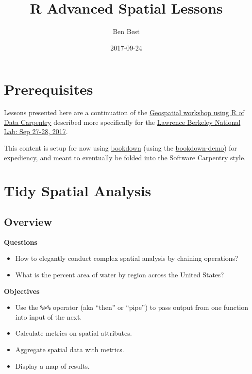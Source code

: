 \documentclass[]{book}
\title{R Advanced Spatial Lessons}
\author{Ben Best}
\date{2017-09-24}
\providecommand{\tightlist}{%
  \setlength{\itemsep}{0pt}\setlength{\parskip}{0pt}}
\theoremstyle{definition}
\theoremstyle{definition}
\theoremstyle{definition}
\theoremstyle{remark}
\begin{document}
\maketitle

{
\setcounter{tocdepth}{1}
\tableofcontents
}
\chapter*{Prerequisites}\label{prereq}

Lessons presented here are a continuation of the
\href{http://www.datacarpentry.org/lessons/\#geospatial-data-workshop}{Geospatial
workshop using R of Data Carpentry} described more specifically for the
\href{https://jsta.github.io/2017-09-27-LBNL/}{Lawrence Berkeley
National Lab: Sep 27-28, 2017}.

This content is setup for now using
\href{http://bookdown.org/yihui/bookdown}{bookdown} (using the
\href{https://github.com/rstudio/bookdown-demo}{bookdown-demo}) for
expediency, and meant to eventually be folded into the
\href{https://github.com/swcarpentry/styles}{Software Carpentry style}.

\chapter{Tidy Spatial Analysis}\label{tidy}

\section{Overview}\label{overview}

\textbf{Questions}

\begin{itemize}
\tightlist
\item
  How to elegantly conduct complex spatial analysis by chaining
  operations?
\item
  What is the percent area of water by region across the United States?
\end{itemize}

\textbf{Objectives}

\begin{itemize}
\tightlist
\item
  Use the \texttt{\%\textgreater{}\%} operator (aka ``then'' or
  ``pipe'') to pass output from one function into input of the next.
\item
  Calculate metrics on spatial attributes.
\item
  Aggregate spatial data with metrics.
\item
  Display a map of results.
\end{itemize}
\end{document}
